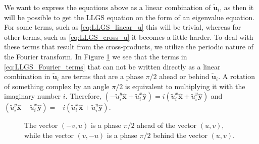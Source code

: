 We want to express the equations above as a linear combination of $\tilde{\mathbold{u}}_i$, as then it will be possible to get the LLGS equation on the form of an eigenvalue equation. For some terms, such as \eqref{eq:LLGS_linear_u} this will be trivial, whereas for other terms, such as \eqref{eq:LLGS_cross_u} it becomes a little harder. To deal with these terms that result from the cross-products, we utilize the periodic nature of the Fourier transform. In Figure \ref{fig:VectorPhases} we see that the terms in \eqref{eq:LLGS_Fourier_terms} that can not be written directly as a linear combination in $\tilde{\mathbold{u}}_i$ are terms that are a phase $\pi/2$ ahead or behind $\tilde{\mathbold{u}}_i$. A rotation of something complex by an angle $\pi/2$ is equivalent to multiplying it with the imaginary number $i$. Therefore, $\left(- \tilde{u}^y_i\mathbold{\hat{x}} + \tilde{u}^x_i \mathbold{\hat{y}} \right) = i \left(\tilde{u}^x_i\mathbold{\hat{x}} + \tilde{u}^y_i \mathbold{\hat{y}} \right)$ and $\left( \tilde{u}^y_i\mathbold{\hat{x}} - \tilde{u}^x_i \mathbold{\hat{y}} \right) = -i \left(\tilde{u}^x_i\mathbold{\hat{x}} + \tilde{u}^y_i \mathbold{\hat{y}} \right)$.
\begin{figure}[h!]
\begin{center}
\caption{The vector $(-v,u)$ is a phase $\pi/2$ ahead of the vector $(u,v)$, while the vector $(v,-u)$ is a phase $\pi/2$ behind the vector $(u,v)$.}
\label{fig:VectorPhases} 
\end{center}
\end{figure}
